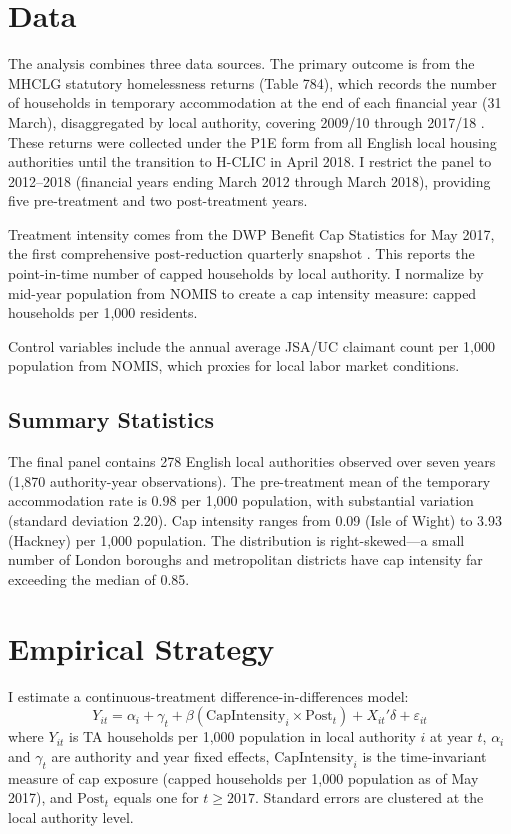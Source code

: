 \documentclass[12pt]{article}
\begin{document}
\section{Data}
\label{sec:data}

The analysis combines three data sources. The primary outcome is from the MHCLG statutory homelessness returns (Table 784), which records the number of households in temporary accommodation at the end of each financial year (31 March), disaggregated by local authority, covering 2009/10 through 2017/18 \citep{mhclg2018homelessness}. These returns were collected under the P1E form from all English local housing authorities until the transition to H-CLIC in April 2018. I restrict the panel to 2012--2018 (financial years ending March 2012 through March 2018), providing five pre-treatment and two post-treatment years.

Treatment intensity comes from the DWP Benefit Cap Statistics for May 2017, the first comprehensive post-reduction quarterly snapshot \citep{dwp2017benefitcap}. This reports the point-in-time number of capped households by local authority. I normalize by mid-year population from NOMIS to create a cap intensity measure: capped households per 1,000 residents.

Control variables include the annual average JSA/UC claimant count per 1,000 population from NOMIS, which proxies for local labor market conditions.

\subsection{Summary Statistics}



The final panel contains 278 English local authorities observed over seven years (1,870 authority-year observations). The pre-treatment mean of the temporary accommodation rate is 0.98 per 1,000 population, with substantial variation (standard deviation 2.20). Cap intensity ranges from 0.09 (Isle of Wight) to 3.93 (Hackney) per 1,000 population. The distribution is right-skewed---a small number of London boroughs and metropolitan districts have cap intensity far exceeding the median of 0.85.

\section{Empirical Strategy}
\label{sec:strategy}

I estimate a continuous-treatment difference-in-differences model:
\begin{equation}
Y_{it} = \alpha_i + \gamma_t + \beta \left( \text{CapIntensity}_i \times \text{Post}_t \right) + X_{it}'\delta + \varepsilon_{it}
\label{eq:main}
\end{equation}
where $Y_{it}$ is TA households per 1,000 population in local authority $i$ at year $t$, $\alpha_i$ and $\gamma_t$ are authority and year fixed effects, $\text{CapIntensity}_i$ is the time-invariant measure of cap exposure (capped households per 1,000 population as of May 2017), and $\text{Post}_t$ equals one for $t \geq 2017$. Standard errors are clustered at the local authority level.
\end{document}
